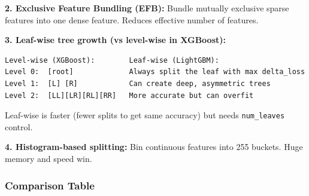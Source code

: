 \documentclass[11pt]{article}
\begin{document}
\textbf{2. Exclusive Feature Bundling (EFB):}
Bundle mutually exclusive sparse features into one dense feature. Reduces effective number of features.

\textbf{3. Leaf-wise tree growth (vs level-wise in XGBoost):}

\setcodelang{}

\begin{verbatim}
Level-wise (XGBoost):        Leaf-wise (LightGBM):
Level 0:  [root]             Always split the leaf with max delta_loss
Level 1:  [L] [R]            Can create deep, asymmetric trees
Level 2:  [LL][LR][RL][RR]   More accurate but can overfit
\end{verbatim}

Leaf-wise is faster (fewer splits to get same accuracy) but needs \texttt{num\_leaves} control.

\textbf{4. Histogram-based splitting:}
Bin continuous features into 255 buckets. Huge memory and speed win.

\subsubsection{Comparison Table}\label{comparison-table}
\end{document}
